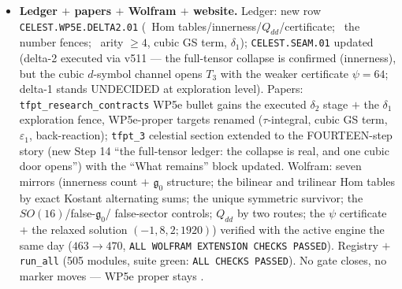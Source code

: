 \begin{itemize}[leftmargin=1.5em]
holomorphic $q^0$ reading is REFUTED at the $\Z_2$/Eguchi--Hanson anchor (method boundary, not a
kill); (ii) the forced leading $(T_5,T_3)$ ratio is $4{:}3$ (sector $2$ : sectors $1{+}3$);
(iii) the $SL(2,\Z)$ orbit decomposition $15=12+3$ identifies the contact term as the MODULAR
COMPLETION of the AB data (a Harvey--Moore-type $\tau$-integral), not a free number; (iv) massive
coset levels $n\ge2$ are mandatory. The remaining $\delta_1$ target is the $\tau$-integral,
evaluated against the $\delta_2$-sharpened criterion ($\psi=64$ slice or selection-rule
relaxation).
\item \textbf{Ledger $+$ papers $+$ Wolfram $+$ website.} Ledger: new row
\texttt{CELEST.WP5E.DELTA2.01} (\mE\ Hom tables/innerness/$Q_{dd}$/certificate; \mC\ the number
fences; \mO\ arity $\ge4$, cubic GS term, $\delta_1$); \texttt{CELEST.SEAM.01} updated (delta-2
executed via v511 --- the full-tensor collapse is confirmed (innerness), but the cubic $d$-symbol
channel opens $T_3$ with the weaker certificate $\psi=64$; delta-1 stands UNDECIDED at
exploration level). Papers: \texttt{tfpt\_research\_contracts} WP5e bullet gains the executed
$\delta_2$ stage $+$ the $\delta_1$ exploration fence, WP5e-proper targets renamed
($\tau$-integral, cubic GS term, $\varepsilon_1$, back-reaction); \texttt{tfpt\_3} celestial
section extended to the FOURTEEN-step story (new Step 14 ``the full-tensor ledger: the collapse
is real, and one cubic door opens'') with the ``What remains'' block updated. Wolfram: seven
mirrors (innerness count $+$ $\mathfrak g_0$ structure; the bilinear and trilinear Hom tables by
exact Kostant alternating sums; the unique symmetric survivor; the $SO(16)$/false-$\mathfrak g_0$/
false-sector controls; $Q_{dd}$ by two routes; the $\psi$ certificate $+$ the relaxed solution
$(-1,8,2;1920)$) verified with the active engine the same day ($463\to470$,
\texttt{ALL WOLFRAM EXTENSION CHECKS PASSED}). Registry $+$ \texttt{run\_all} (505 modules, suite
green: \texttt{ALL CHECKS PASSED}). No gate closes, no marker moves --- WP5e proper stays \mO.
\end{itemize}

